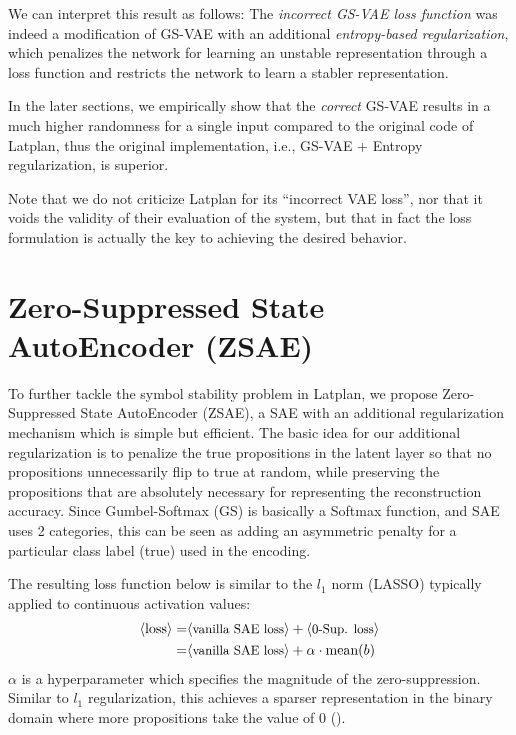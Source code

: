 We can interpret this result as follows:
The \emph{incorrect GS-VAE loss function}
was indeed a modification of GS-VAE with an additional \emph{entropy-based regularization},
which penalizes the network for learning an unstable representation
through a loss function and restricts the network to learn a stabler representation.

In the later sections, we empirically show that the \emph{correct} GS-VAE results in
a much higher randomness for a single input compared to the original code of Latplan,
thus the original implementation, i.e., GS-VAE + Entropy regularization, is superior.

Note that we do not criticize Latplan for its ``incorrect VAE loss'',
nor that it voids the validity of their evaluation of the system,
but that in fact the loss formulation is actually the key to achieving the desired behavior.

\section{Zero-Suppressed State AutoEncoder (ZSAE)}
\label{zsae}

To further tackle the symbol stability problem in Latplan, we propose Zero-Suppressed State AutoEncoder (ZSAE),
a SAE with an additional regularization mechanism which is simple but efficient.
The basic idea for our additional regularization is to penalize the
true propositions in the latent layer so that no propositions unnecessarily flip to true at random,
while preserving the propositions that are absolutely necessary for representing the reconstruction accuracy.
Since Gumbel-Softmax (GS) is basically a Softmax function,
and SAE uses 2 categories, this can be seen as adding an
asymmetric penalty for a particular class label (true) used in the encoding.

The resulting loss function below is similar to the $l_1$ norm (LASSO) typically
applied to continuous activation values:
\begin{align*}
 \brackets{\text{loss}} = & \brackets{\text{\small vanilla SAE loss}} + \brackets{\text{\small 0-Sup. loss}} \\ 
 =                        & \brackets{\text{\small vanilla SAE loss}} + \alpha\cdot\text{mean}(b)
\end{align*}
$\alpha$ is a hyperparameter which specifies the magnitude of the zero-suppression.
Similar to $l_1$ regularization, this achieves a sparser representation in the binary domain where
 more propositions take the value of 0 ().

